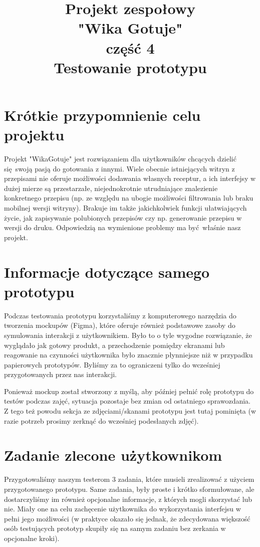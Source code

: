 \documentclass{article}
\title{\fontsize{20}{22}\selectfont Projekt zespołowy\\ "Wika Gotuje" \\ część 4\\Testowanie prototypu}
\begin{document}
\maketitle

\section{Krótkie przypomnienie celu projektu}
Projekt "WikaGotuje" jest rozwiązaniem dla użytkowników chcących dzielić się swoją pasją do gotowania z innymi. Wiele obecnie istniejących witryn z przepisami nie oferuje możliwości
dodawania własnych receptur, a ich interfejsy w dużej mierze są przestarzałe, niejednokrotnie utrudniające znalezienie konkretnego przepisu (np. ze względu na ubogie możliwości
filtrowania lub braku mobilnej wersji witryny). Brakuje im także jakichkolwiek funkcji ułatwiających życie, jak zapisywanie polubionych przepisów czy np. generowanie
przepisu w wersji do druku. Odpowiedzią na wymienione problemy ma być właśnie nasz projekt.\newline

\section{Informacje dotyczące samego prototypu}
Podczas testowania prototypu korzystaliśmy z komputerowego narzędzia do tworzenia mockupów (Figma), które oferuje również podstawowe zasoby do symulowania interakcji z użytkownikiem. 
Było to o tyle wygodne rozwiązanie, że wyglądało jak gotowy produkt, a przechodzenie pomiędzy ekranami lub reagowanie na czynności użytkownika było znacznie płynniejsze niż w 
przypadku papierowych prototypów. Byliśmy za to ograniczeni tylko do wcześniej przygotowanych przez nas interakcji. 

Ponieważ mockup został stworzony z myślą, aby później pełnić rolę prototypu do testów podczas zajęć, sytuacja pozostaje bez zmian od ostatniego sprawozdania. 
Z tego też powodu sekcja ze zdjęciami/skanami prototypu jest tutaj pominięta (w razie potrzeb prosimy zerknąć 
do wcześniej podesłanych zdjęć).

\section{Zadanie zlecone użytkownikom}
Przygotowaliśmy naszym testerom 3 zadania, które musieli zrealizować z użyciem przygotowanego prototypu. Same zadania, były proste i krótko sformułowane, ale dostarczyliśmy im 
również opcjonalne informacje, z których mogli skorzystać lub nie. Miały one na celu zachęcenie użytkownika do wykorzystania interfejsu w pełni jego możliwości (w praktyce okazało się 
jednak, że zdecydowana większość osób testujących prototyp skupiły się na samym zadaniu bez zerkania w opcjonalne kroki).
\end{document}
